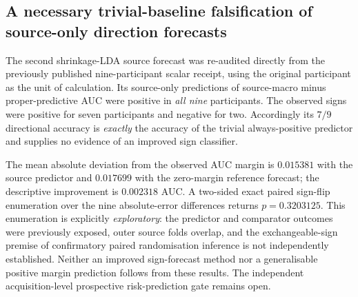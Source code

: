 \subsection{A necessary trivial-baseline falsification of source-only direction forecasts}
\label{sec:p1-forecast-null}
The second shrinkage-LDA source forecast was re-audited directly from the
previously published nine-participant scalar receipt, using the original
participant as the unit of calculation. Its source-only predictions of
source-macro minus proper-predictive AUC were positive in
\emph{all nine} participants. The observed signs were positive for
seven participants and negative for two. Accordingly its $7/9$
directional accuracy is \emph{exactly} the accuracy of the trivial
always-positive predictor and supplies no evidence of an improved sign
classifier.

The mean absolute deviation from the observed AUC margin is
$0.015381$ with the source predictor and $0.017699$ with the
zero-margin reference forecast; the descriptive improvement is
$0.002318$ AUC. A two-sided exact paired sign-flip enumeration over
the nine absolute-error differences returns $p=0.3203125$.
This enumeration is explicitly \emph{exploratory}: the predictor
and comparator outcomes were previously exposed, outer source folds
overlap, and the exchangeable-sign premise of confirmatory paired
randomisation inference is not independently established.
Neither an improved sign-forecast method nor a generalisable
positive margin prediction follows from these results.
The independent acquisition-level prospective risk-prediction
gate remains open.
